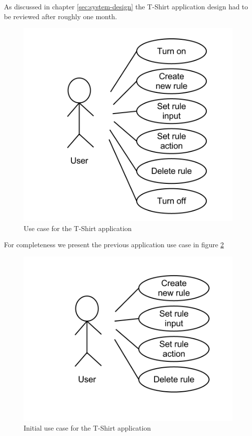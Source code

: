 As discussed in chapter \ref{sec:system-design} the T-Shirt application design had to be reviewed after roughly one month.

\begin{figure}[h!]
\centering \includegraphics[scale=0.35]{img/design-tshirtappusecase2}
\caption{Use case for the T-Shirt application}
\label{fig:design-tshirtappusecase2}
\end{figure}

For completeness we present the previous application use case in figure \ref{fig:design-tshirtappusecase1}

\begin{figure}[h!]
\centering \includegraphics[scale=0.35]{img/design-tshirtappusecase1}
\caption{Initial use case for the T-Shirt application}
\label{fig:design-tshirtappusecase1}
\end{figure}

